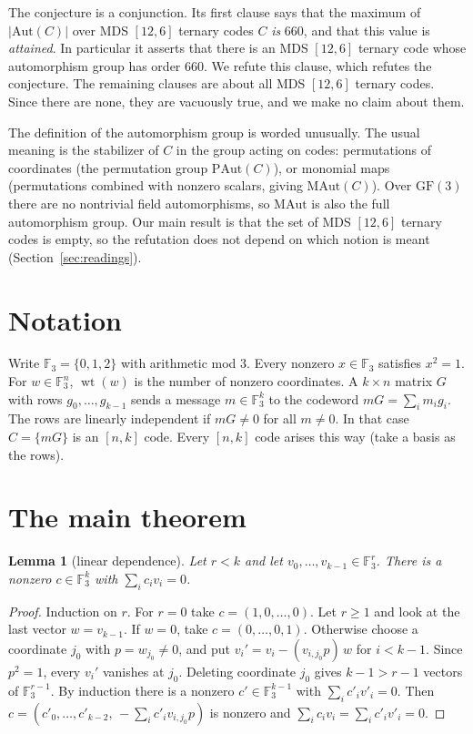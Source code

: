 \documentclass[11pt]{article}
\newtheorem{lemma}[theorem]{Lemma}
\theoremstyle{remark}
\newcommand{\F}{\mathbb{F}_3}
\newcommand{\wt}{\operatorname{wt}}
\begin{document}
The conjecture is a conjunction. Its first clause says that the maximum of
$|\mathrm{Aut}(C)|$ over MDS $[12,6]$ ternary codes $C$ \emph{is} $660$, and that
this value is \emph{attained}. In particular it asserts that there is an MDS
$[12,6]$ ternary code whose automorphism group has order $660$. We refute this
clause, which refutes the conjecture. The remaining clauses are about all MDS
$[12,6]$ ternary codes. Since there are none, they are vacuously true, and we
make no claim about them.

The definition of the automorphism group is worded unusually. The usual
meaning is the stabilizer of $C$ in the group acting on codes: permutations of
coordinates (the permutation group $\mathrm{PAut}(C)$), or monomial maps
(permutations combined with nonzero scalars, giving $\mathrm{MAut}(C)$). Over
$\mathrm{GF}(3)$ there are no nontrivial field automorphisms, so $\mathrm{MAut}$
is also the full automorphism group. Our main result is that the set of MDS
$[12,6]$ ternary codes is empty, so the refutation does not depend on which
notion is meant (Section~\ref{sec:readings}).

\section{Notation}
Write $\F=\{0,1,2\}$ with arithmetic mod $3$. Every nonzero $x\in\F$ satisfies
$x^2=1$. For $w\in\F^n$, $\wt(w)$ is the number of nonzero coordinates. A
$k\times n$ matrix $G$ with rows $g_0,\dots,g_{k-1}$ sends a message
$m\in\F^k$ to the codeword $mG=\sum_i m_ig_i$. The rows are linearly
independent if $mG\ne0$ for all $m\ne0$. In that case $C=\{mG\}$ is an
$[n,k]$ code. Every $[n,k]$ code arises this way (take a basis as the rows).

\section{The main theorem}
\begin{lemma}[linear dependence]\label{lem:dep}
Let $r<k$ and let $v_0,\dots,v_{k-1}\in\F^r$. There is a nonzero
$c\in\F^k$ with $\sum_i c_iv_i=0$.
\end{lemma}
\begin{proof}
Induction on $r$. For $r=0$ take $c=(1,0,\dots,0)$. Let $r\ge1$ and look at the
last vector $w=v_{k-1}$. If $w=0$, take $c=(0,\dots,0,1)$. Otherwise choose a
coordinate $j_0$ with $p=w_{j_0}\ne0$, and put
$v_i'=v_i-(v_{i,j_0}p)\,w$ for $i<k-1$. Since $p^2=1$, every $v_i'$ vanishes at
$j_0$. Deleting coordinate $j_0$ gives $k-1>r-1$ vectors of $\F^{r-1}$. By
induction there is a nonzero $c'\in\F^{k-1}$ with $\sum_ic'_iv'_i=0$. Then
$c=(c'_0,\dots,c'_{k-2},\,-\sum_ic'_iv_{i,j_0}p)$ is nonzero and
$\sum_ic_iv_i=\sum_ic'_iv'_i=0$.
\end{proof}
\end{document}
